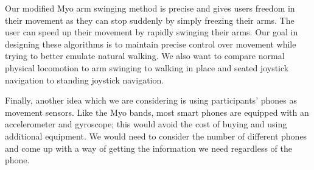 \documentclass{vgtc}                          %
\begin{document}
Our modified Myo arm swinging method is precise and gives users freedom in their movement as they can
stop suddenly by simply freezing their arms.
The user can speed up their movement by rapidly swinging their arms.
Our goal in designing these algorithms is to maintain precise control over movement
while trying to better emulate natural walking.
We also want to compare normal physical locomotion to arm swinging to walking in place
and seated joystick navigation to standing joystick navigation.

Finally, another idea which we are considering is using participants' phones as movement sensors.
Like the Myo bands, most smart phones are equipped with an accelerometer and gyroscope;
this would avoid the cost of buying and using additional equipment.
We would need to consider the number of different phones
and come up with a way of getting the information we need regardless of the phone.




\end{document}
